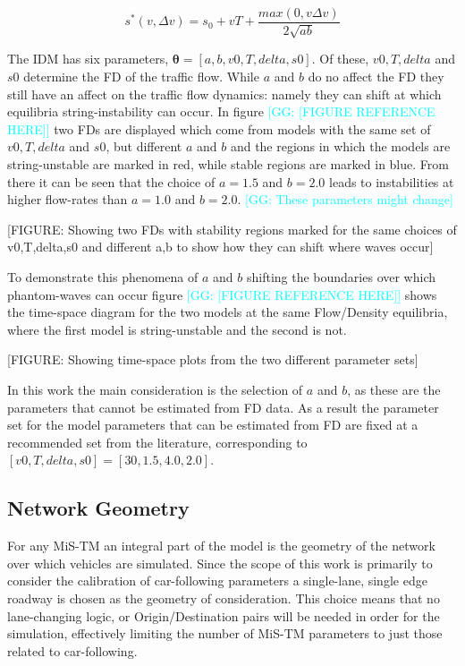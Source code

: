 \documentclass[english,titlepage,oneside,12pt]{article}
\newcommand{\kibitz}[2]{\ifnum\Comments=1\textcolor{#1}{#2}\fi}
\newcommand{\George}[1]{\kibitz{cyan}      {[GG: #1]}}
\begin{document}
\begin{equation}\label{eq:IDM_Spacing_Equation}
    s^{*}\left(v,\Delta v\right)=s_{0}+vT+\frac{max(0,v\Delta v)}{2\sqrt{ab}}
\end{equation}

The IDM has six parameters, $\boldsymbol{\theta} = [a,b,v0,T,delta,s0]$. Of these, $v0,T,delta$ and $s0$ determine the FD of the traffic flow. While $a$ and $b$ do no affect the FD they still have an affect on the traffic flow dynamics: namely they can shift at which equilibria string-instability can occur. In figure \George{[FIGURE REFERENCE HERE]} two FDs are displayed which come from models with the same set of $v0,T,delta$ and $s0$, but different $a$ and $b$ and the regions in which the models are string-unstable are marked in red, while stable regions are marked in blue. From there it can be seen that the choice of $a=1.5$ and $b=2.0$ leads to instabilities at higher flow-rates than $a=1.0$ and $b=2.0$. \George{These parameters might change}

[FIGURE: Showing two FDs with stability regions marked for the same choices of v0,T,delta,s0 and different a,b to show how they can shift where waves occur] 

To demonstrate this phenomena of $a$ and $b$ shifting the boundaries over which phantom-waves can occur figure \George{[FIGURE REFERENCE HERE]} shows the time-space diagram for the two models at the same Flow/Density equilibria, where the first model is string-unstable and the second is not.

[FIGURE: Showing time-space plots from the two different parameter sets]

In this work the main consideration is the selection of $a$ and $b$, as these are the parameters that cannot be estimated from FD data. As a result the parameter set for the model parameters that can be estimated from FD are fixed at a recommended set from the literature, corresponding to $[v0,T,delta,s0]=[30,1.5,4.0,2.0]$.

\subsection{Network Geometry}
For any MiS-TM an integral part of the model is the geometry of the network over which vehicles are simulated. Since the scope of this work is primarily to consider the calibration of car-following parameters a single-lane, single edge roadway is chosen as the geometry of consideration. This choice means that no lane-changing logic, or Origin/Destination pairs will be needed in order for the simulation, effectively limiting the number of MiS-TM parameters to just those related to car-following. 
\end{document}
